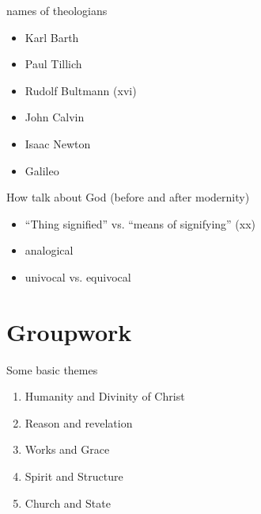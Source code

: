 \begin{frame}[label=sec-2-3]{names of theologians}
\begin{itemize}
\item Karl Barth
\item Paul Tillich
\item Rudolf Bultmann (xvi)
\item John Calvin
\item Isaac Newton
\item Galileo
\end{itemize}
\end{frame}
\begin{frame}[label=sec-2-4]{How talk about God (before and after modernity)}
\begin{itemize}[<+->]
\item ``Thing signified'' vs. ``means of signifying'' (xx)
\item analogical
\item univocal vs. equivocal
\end{itemize}
\end{frame}
\section{Groupwork}
\label{sec-3}
\begin{frame}[label=sec-3-1]{Some basic themes}
\begin{enumerate}
\item Humanity and Divinity of Christ
\item Reason and revelation
\item Works and Grace
\item Spirit and Structure
\item Church and State
\end{enumerate}
\end{frame}

